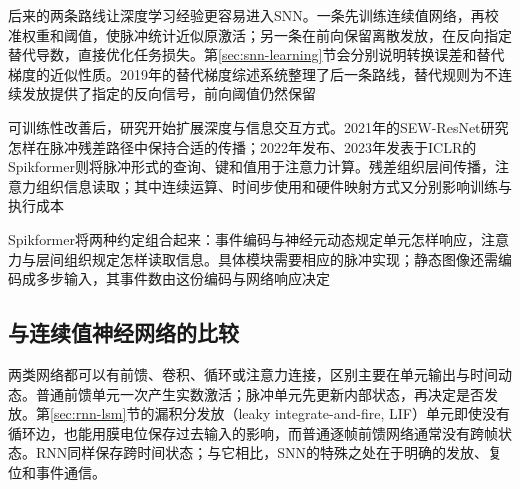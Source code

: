 后来的两条路线让深度学习经验更容易进入SNN。一条先训练连续值网络，再校准权重和阈值，使脉冲统计近似原激活；另一条在前向保留离散发放，在反向指定替代导数，直接优化任务损失。第\ref{sec:snn-learning}节会分别说明转换误差和替代梯度的近似性质。2019年的替代梯度综述系统整理了后一条路线，替代规则为不连续发放提供了指定的反向信号，前向阈值仍然保留

可训练性改善后，研究开始扩展深度与信息交互方式。2021年的SEW-ResNet研究怎样在脉冲残差路径中保持合适的传播；2022年发布、2023年发表于ICLR的Spikformer则将脉冲形式的查询、键和值用于注意力计算。残差组织层间传播，注意力组织信息读取；其中连续运算、时间步使用和硬件映射方式又分别影响训练与执行成本

Spikformer将两种约定组合起来：事件编码与神经元动态规定单元怎样响应，注意力与层间组织规定怎样读取信息。具体模块需要相应的脉冲实现；静态图像还需编码成多步输入，其事件数由这份编码与网络响应决定

\subsection{与连续值神经网络的比较}
\label{sec:snn-ann-comparison}

两类网络都可以有前馈、卷积、循环或注意力连接，区别主要在单元输出与时间动态。普通前馈单元一次产生实数激活；脉冲单元先更新内部状态，再决定是否发放。第\ref{sec:rnn-lsm}节的漏积分发放（leaky integrate-and-fire, LIF）单元即使没有循环边，也能用膜电位保存过去输入的影响，而普通逐帧前馈网络通常没有跨帧状态。RNN同样保存跨时间状态；与它相比，SNN的特殊之处在于明确的发放、复位和事件通信。


